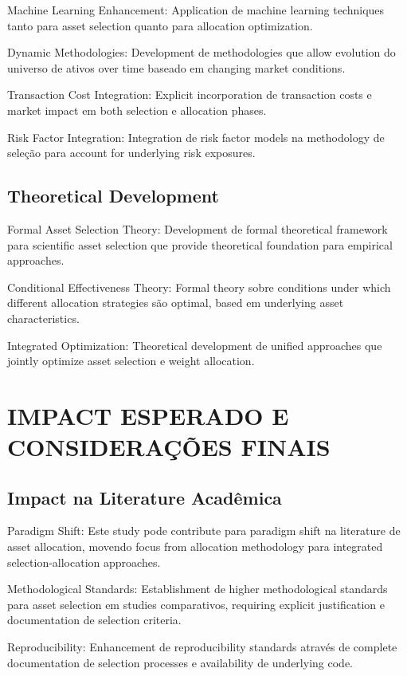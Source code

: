 Machine Learning Enhancement: Application de machine learning techniques tanto para asset selection quanto para allocation optimization.

Dynamic Methodologies: Development de methodologies que allow evolution do universo de ativos over time baseado em changing market conditions.

Transaction Cost Integration: Explicit incorporation de transaction costs e market impact em both selection e allocation phases.

Risk Factor Integration: Integration de risk factor models na methodology de seleção para account for underlying risk exposures.

\subsection{Theoretical Development}

Formal Asset Selection Theory: Development de formal theoretical framework para scientific asset selection que provide theoretical foundation para empirical approaches.

Conditional Effectiveness Theory: Formal theory sobre conditions under which different allocation strategies são optimal, based em underlying asset characteristics.

Integrated Optimization: Theoretical development de unified approaches que jointly optimize asset selection e weight allocation.

\section{IMPACT ESPERADO E CONSIDERAÇÕES FINAIS}

\subsection{Impact na Literature Acadêmica}

Paradigm Shift: Este study pode contribute para paradigm shift na literature de asset allocation, movendo focus from allocation methodology para integrated selection-allocation approaches.

Methodological Standards: Establishment de higher methodological standards para asset selection em studies comparativos, requiring explicit justification e documentation de selection criteria.

Reproducibility: Enhancement de reproducibility standards através de complete documentation de selection processes e availability de underlying code.

